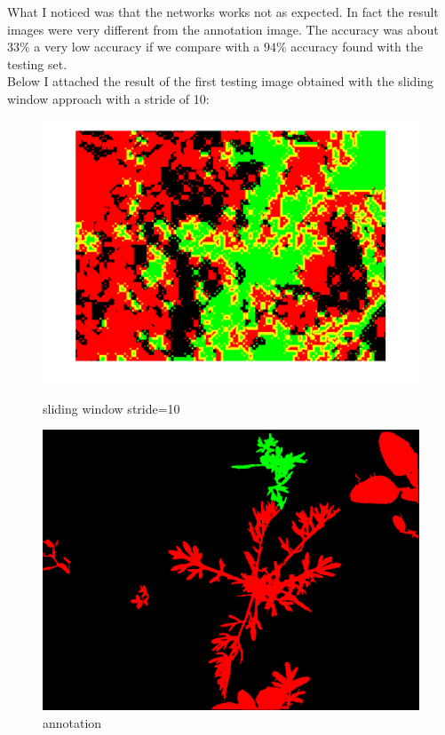\documentclass[]{report}
\begin{document}
What I noticed was that the networks works not as expected. In fact the result images were very different from the annotation image. The accuracy was about $ 33\% $ a very low accuracy if we compare with a $ 94\% $ accuracy found with the testing set.\\
Below I attached the result of the first testing image obtained with the sliding window approach with a stride of 10:

\begin{figure}[!htb]
  \includegraphics[width=\linewidth]{stride10im1.png}
  \caption{sliding window stride=10}\label{fig: sliding window problem}
\endminipage\hfill
{}
  \includegraphics[width=\linewidth]{annotation.png}
  \caption{annotation}\label{fig:annotation}
\endminipage\hfill
\end{figure}
\newpage
\end{document}
